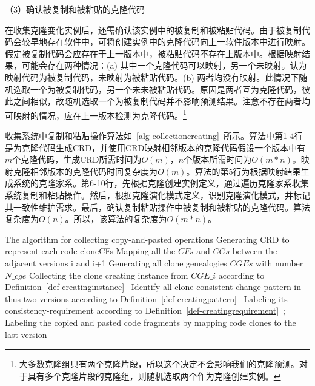 （3）确认被复制和被粘贴的克隆代码

在收集克隆变化实例后，还需确认该实例中的被复制和被粘贴代码。由于被复制代码会较早地存在软件中，可将创建实例中的克隆代码向上一软件版本中进行映射。假定被复制代码会应存在于上一版本中，被粘贴代码不存在上版本中。根据映射结果，可能会存在两种情况：(a) 其中一个克隆代码可以映射，另一个未映射。认为映射代码为被复制代码，未映射为被粘贴代码。(b) 两者均没有映射。此情况下随机选取一个为被复制代码，另一个未未被粘贴代码。原因是两者互为克隆代码，彼此之间相似，故随机选取一个为被复制代码并不影响预测结果。注意不存在两者均可映射的情况，应在上一版本检测为克隆代码。\footnote{大多数克隆组只有两个克隆片段，所以这个决定不会影响我们的克隆预测。对于具有多个克隆片段的克隆组，则随机选取两个作为克隆创建实例。}

收集系统中复制和粘贴操作算法如~\ref{alg-collectioncreating}~所示。算法中第1-4行是为克隆代码生成CRD，并使用CRD映射相邻版本的克隆代码假设一个版本中有$m$个克隆代码，生成CRD所需时间为$O(m)$，$n$个版本所需时间为$O(m*n)$。映射克隆相邻版本的克隆代码时间复杂度为$O(m)$。算法的第5行为根据映射结果生成系统的克隆家系。第6-10行，先根据克隆创建实例定义，通过遍历克隆家系收集系统复制和粘贴操作。然后，根据克隆演化模式定义，识别克隆演化模式，并标记其一致性维护需求。最后，确认复制粘贴操作中被复制和被粘贴的克隆代码。算法复杂度为$O(n)$。所以，该算法的复杂度为$O(m*n)$。

\begin{minipage}{0.8\textwidth}
\centering
\begin{algorithm}[H]
 {The algorithm for collecting copy-and-pasted operations}
\label{alg-collectioncreating}
{ 
 Generating CRD to represent each code clone{CFs}\;
 Mapping all the $CFs$ and $CGs$ between the adjacent versions {i} and {i+1}\;
}
Generating all clone genealogies $CGEs$ with number $N\_cge$\;
{ 
 Collecting the clone creating instance from $CGE\_i$ according to Definition~\ref{def-creatinginstance}~\; 
 Identify all clone consistent change pattern in thus two versions according to Definition~\ref{def-creatingpattern}~\;
 Labeling its consistency-requirement according to Definition~\ref{def-creatingrequirement}~; 
 Labeling the copied and pasted code fragments by mapping code clones to the last version\;
}
\end{algorithm}
\end{minipage}

